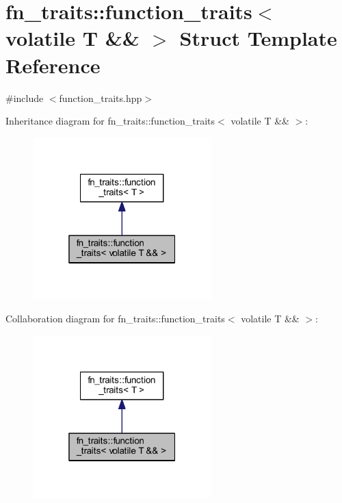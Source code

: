 \hypertarget{structfn__traits_1_1function__traits_3_01volatile_01_t_01_6_6_01_4}{}\section{fn\+\_\+traits\+:\+:function\+\_\+traits$<$ volatile T \&\& $>$ Struct Template Reference}
\label{structfn__traits_1_1function__traits_3_01volatile_01_t_01_6_6_01_4}


{\ttfamily \#include $<$function\+\_\+traits.\+hpp$>$}



Inheritance diagram for fn\+\_\+traits\+:\+:function\+\_\+traits$<$ volatile T \&\& $>$\+:\nopagebreak
\begin{figure}[H]
\begin{center}
\leavevmode
\includegraphics[width=196pt]{dd/db4/structfn__traits_1_1function__traits_3_01volatile_01_t_01_6_6_01_4__inherit__graph}
\end{center}
\end{figure}


Collaboration diagram for fn\+\_\+traits\+:\+:function\+\_\+traits$<$ volatile T \&\& $>$\+:\nopagebreak
\begin{figure}[H]
\begin{center}
\leavevmode
\includegraphics[width=196pt]{d8/dac/structfn__traits_1_1function__traits_3_01volatile_01_t_01_6_6_01_4__coll__graph}
\end{center}
\end{figure}


